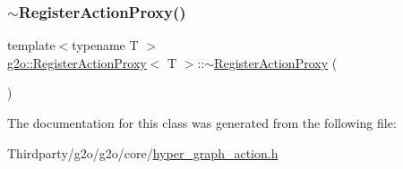 \mbox{\label{classg2o_1_1_register_action_proxy_a73e8eacc965c3e9bb2084570c6b67eed}} 
\subsubsection{\texorpdfstring{$\sim$\+Register\+Action\+Proxy()}{~RegisterActionProxy()}}
{\footnotesize\ttfamily template$<$typename T $>$ \\
\mbox{\hyperlink{classg2o_1_1_register_action_proxy}{g2o\+::\+Register\+Action\+Proxy}}$<$ T $>$\+::$\sim$\mbox{\hyperlink{classg2o_1_1_register_action_proxy}{Register\+Action\+Proxy}} (\begin{DoxyParamCaption}{ }\end{DoxyParamCaption})\hspace{0.3cm}{\ttfamily [inline]}}



The documentation for this class was generated from the following file\+:\begin{DoxyCompactItemize}
\item 
Thirdparty/g2o/g2o/core/\mbox{\hyperlink{hyper__graph__action_8h}{hyper\+\_\+graph\+\_\+action.\+h}}\end{DoxyCompactItemize}
